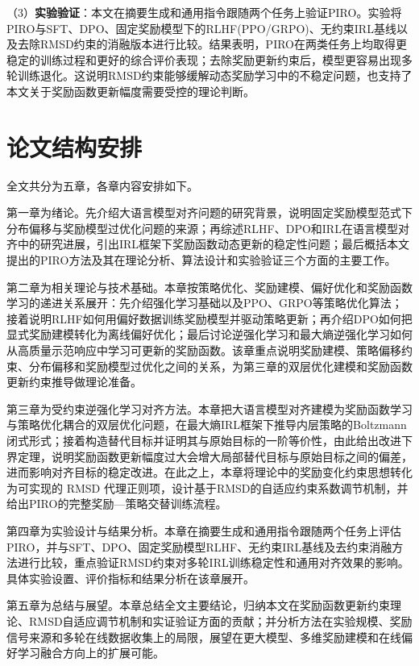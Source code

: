 （3）\textbf{实验验证}：本文在摘要生成和通用指令跟随两个任务上验证PIRO。实验将PIRO与SFT、DPO、固定奖励模型下的RLHF(PPO/GRPO)、无约束IRL基线以及去除RMSD约束的消融版本进行比较。结果表明，PIRO在两类任务上均取得更稳定的训练过程和更好的综合评价表现；去除奖励更新约束后，模型更容易出现多轮训练退化。这说明RMSD约束能够缓解动态奖励学习中的不稳定问题，也支持了本文关于奖励函数更新幅度需要受控的理论判断。


\section{论文结构安排}

全文共分为五章，各章内容安排如下。

第一章为绪论。先介绍大语言模型对齐问题的研究背景，说明固定奖励模型范式下分布偏移与奖励模型过优化问题的来源；再综述RLHF、DPO和IRL在语言模型对齐中的研究进展，引出IRL框架下奖励函数动态更新的稳定性问题；最后概括本文提出的PIRO方法及其在理论分析、算法设计和实验验证三个方面的主要工作。

第二章为相关理论与技术基础。本章按策略优化、奖励建模、偏好优化和奖励函数学习的递进关系展开：先介绍强化学习基础以及PPO、GRPO等策略优化算法；接着说明RLHF如何用偏好数据训练奖励模型并驱动策略更新；再介绍DPO如何把显式奖励建模转化为离线偏好优化；最后讨论逆强化学习和最大熵逆强化学习如何从高质量示范响应中学习可更新的奖励函数。该章重点说明奖励建模、策略偏移约束、分布偏移和奖励模型过优化之间的关系，为第三章的双层优化建模和奖励函数更新约束推导做理论准备。

第三章为受约束逆强化学习对齐方法。本章把大语言模型对齐建模为奖励函数学习与策略优化耦合的双层优化问题，在最大熵IRL框架下推导内层策略的Boltzmann闭式形式；接着构造替代目标并证明其与原始目标的一阶等价性，由此给出改进下界定理，说明奖励函数更新幅度过大会增大局部替代目标与原始目标之间的偏差，进而影响对齐目标的稳定改进。在此之上，本章将理论中的奖励变化约束思想转化为可实现的 RMSD 代理正则项，设计基于RMSD的自适应约束系数调节机制，并给出PIRO的完整奖励—策略交替训练流程。

第四章为实验设计与结果分析。本章在摘要生成和通用指令跟随两个任务上评估PIRO，并与SFT、DPO、固定奖励模型RLHF、无约束IRL基线及去约束消融方法进行比较，重点验证RMSD约束对多轮IRL训练稳定性和通用对齐效果的影响。具体实验设置、评价指标和结果分析在该章展开。

第五章为总结与展望。本章总结全文主要结论，归纳本文在奖励函数更新约束理论、RMSD自适应调节机制和实证验证方面的贡献；并分析方法在实验规模、奖励信号来源和多轮在线数据收集上的局限，展望在更大模型、多维奖励建模和在线偏好学习融合方向上的扩展可能。


